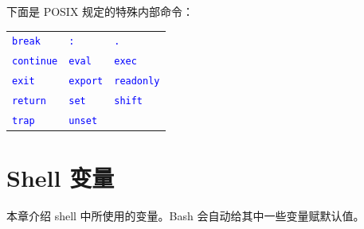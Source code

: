\documentclass[openany,notitlepage]{book}
\newcommand{\code}[1]{\textcolor{blue}{{\tt #1}}}
\begin{document}
\begin{CJK}{UTF8}{song}
下面是 POSIX 规定的特殊内部命令：
\begin{table}[H]
\centering
\begin{tabular}{lll}
\code{break} & \code{:} & \code{.} \\
\code{continue} & \code{eval} & \code{exec} \\
\code{exit} & \code{export} & \code{readonly} \\
\code{return} & \code{set} & \code{shift} \\
\code{trap} & \code{unset}
\end{tabular}
\end{table}


\chapter{Shell 变量}\label{shell-parameter} %
本章介绍 shell 中所使用的变量。Bash 会自动给其中一些变量赋默认值。


\end{CJK}
\end{document}
